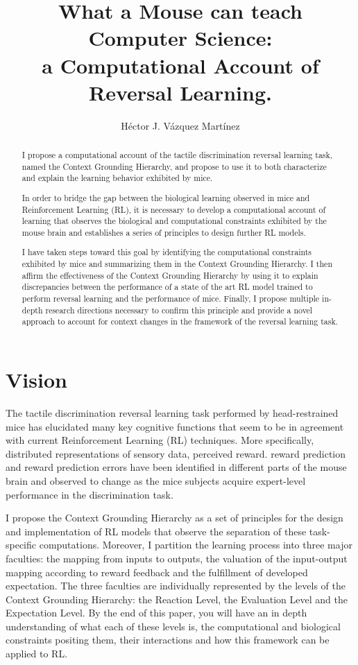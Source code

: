 \documentclass[11pt]{article}
\title{What a Mouse can teach Computer Science: \\
	a Computational Account of Reversal Learning.}
\author{H\'ector J. V\'azquez Mart\'inez}
\begin{document}
\maketitle

\begin{abstract}
	
I propose a computational account of the tactile discrimination reversal learning task, named the Context Grounding Hierarchy, and propose to use it to both characterize and explain the learning behavior exhibited by mice.

In order to bridge the gap between the biological learning observed in mice and Reinforcement Learning (RL), it is necessary to develop a computational account of learning that observes the biological and computational constraints exhibited by the mouse brain and establishes a series of principles to design further RL models.

I have taken steps toward this goal by identifying the computational constraints exhibited by mice and summarizing them in the Context Grounding Hierarchy.  I then affirm the effectiveness of the Context Grounding Hierarchy by using it to explain discrepancies between the performance of a state of the art RL model trained to perform reversal learning and the performance of mice.  Finally, I propose multiple in-depth research directions necessary to confirm this principle and provide a novel approach to account for context changes in the framework of the reversal learning task.
\end{abstract}


\section{Vision}

The tactile discrimination reversal learning task performed by head-restrained mice has elucidated many key cognitive functions that seem to be in agreement with current  Reinforcement Learning (RL) techniques.  More specifically, distributed representations of sensory data, perceived reward. reward prediction and reward prediction errors have been identified in different parts of the mouse brain and observed to change as the mice subjects acquire expert-level performance in the discrimination task. 

I propose the Context Grounding Hierarchy as a set of principles for the design and implementation of RL models that observe the separation of these task-specific computations.  Moreover, I partition the learning process into three major faculties: the mapping from inputs to outputs, the valuation of the input-output mapping according to reward feedback and the fulfillment of developed expectation.  The three faculties are individually represented by the levels of the Context Grounding Hierarchy: the Reaction Level, the Evaluation Level and the Expectation Level.  By the end of this paper, you will have an in depth understanding of what each of these levels is, the computational and biological constraints positing them, their interactions and how this framework can be applied to RL.
\end{document}

